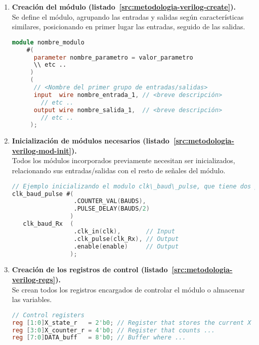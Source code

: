 \begin{enumerate}
    \item{\textbf{Creación del módulo (listado~\ref{src:metodologia-verilog-create}).}} \\
    Se define el módulo, agrupando las entradas y salidas según características similares, posicionando en primer lugar las entradas, seguido de las salidas.
    \begin{lstlisting}[language=Verilog,
        caption={Ejemplo de creación de módulo.},
        label=src:metodologia-verilog-create]
module nombre_modulo
    #(
      parameter nombre_parametro = valor_parametro
      \\ etc ..
     )
     (
      // <Nombre del primer grupo de entradas/salidas>
      input  wire nombre_entrada_1, // <breve descripción>
        // etc ..
      output wire nombre_salida_1,  // <breve descripción>
        // etc ..
     );
    \end{lstlisting}
    
    \item{\textbf{Inicialización de módulos necesarios (listado~\ref{src:metodologia-verilog-mod-init}).}} \\
    Todos los módulos incorporados previamente necesitan ser inicializados, relacionando sus entradas/salidas con el resto de señales del módulo.
    \begin{lstlisting}[language=Verilog,
        caption={Ejemplo inicialización de módulos.},
        label=src:metodologia-verilog-mod-init]
// Ejemplo inicializando el modulo clk\_baud\_pulse, que tiene dos parámetros, una entrada y dos salidas
clk_baud_pulse #(
                 .COUNTER_VAL(BAUDS),
                 .PULSE_DELAY(BAUDS/2)
                )
   clk_baud_Rx  (
                 .clk_in(clk),       // Input
                 .clk_pulse(clk_Rx), // Output
                 .enable(enable)     // Output
                );
    \end{lstlisting}
    
    \item{\textbf{Creación de los registros de control (listado~\ref{src:metodologia-verilog-regs}).}} \\
    Se crean todos los registros encargados de controlar el módulo o almacenar las variables.
    \begin{lstlisting}[language=Verilog,
        caption={Ejemplo de creación de registros.},
        label=src:metodologia-verilog-regs]
// Control registers
reg [1:0]X_state_r   = 2'b0; // Register that stores the current X state
reg [3:0]X_counter_r = 4'b0; // Register that counts ...
reg [7:0]DATA_buff   = 8'b0; // Buffer where ...
    \end{lstlisting}


\end{enumerate}
